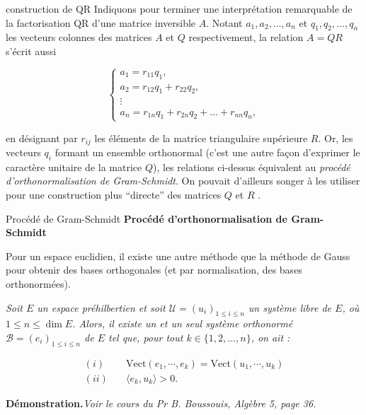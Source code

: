 \documentclass[french, 10pt]{beamer}
\theoremstyle{definition}
\begin{document}
\begin{frame}{construction de QR}
	Indiquons pour terminer une interprétation remarquable de la factorisation QR d’une matrice inversible \( A \). Notant \( a_1, a_2, \dots, a_n \) et \( q_1, q_2, \dots, q_n \) les vecteurs colonnes des matrices \( A \) et \( Q \) respectivement, la relation \( A = QR \) s’écrit aussi  
	
	\[
	\begin{cases}
		a_1 = r_{11} q_1, \\
		a_2 = r_{12} q_1 + r_{22} q_2, \\
		\vdots \\
		a_n = r_{1n} q_1 + r_{2n} q_2 + \dots + r_{nn} q_n,
	\end{cases}
	\]
	
	en désignant par \( r_{ij} \) les éléments de la matrice triangulaire supérieure \( R \). Or, les vecteurs \( q_i \) formant un ensemble orthonormal (c’est une autre façon d’exprimer le caractère unitaire de la matrice \( Q \)), les relations ci-dessus équivalent au \textit{procédé d’orthonormalisation de Gram-Schmidt}. On pouvait d’ailleurs songer à les utiliser pour une construction plus “directe” des matrices \( Q \) et \( R \) .
	
	
\end{frame}
\begin{frame}{Procédé de Gram-Schmidt}
	\textbf{Procédé d'orthonormalisation de Gram-Schmidt}
	
	Pour un espace euclidien, il existe une autre méthode que la méthode de Gauss pour obtenir des bases orthogonales (et par normalisation, des bases orthonormées).
	
	\begin{theorem}
		\textit{Soit \( E \) un espace préhilbertien et soit
			\( \mathcal{U} = (u_i)_{1 \leq i \leq n} \) un système libre de \( E \), où \( 1 \leq n \leq \dim E \). Alors, il existe un et un seul système orthonormé
			\( \mathcal{B} = (e_i)_{1 \leq i \leq n} \) de \( E \) tel que, pour tout $k \in \{1, 2, \dots, n\}$, on ait :}
		
		\[
		\begin{aligned}
			(i) & \quad \text{Vect}(e_1, \cdots, e_k) = \text{Vect}(u_1, \cdots, u_k) \\
			(ii) & \quad \langle e_k, u_k \rangle > 0.
		\end{aligned}
		\]
		
	\end{theorem}
	\textbf{Démonstration.}\textit{Voir le cours du Pr B. Boussouis, Algèbre 5, page 36.}
\end{frame}
\end{document}
